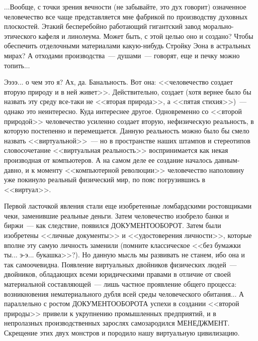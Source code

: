 \documentclass{scrbook}
\newcommand{\flqq}{<<}
\newcommand{\frqq}{>>}
\newcommand{\mdash}{~--- }
\begin{document}
...Вообще, с точки зрения вечности (не забывайте, это дух говорит) означенное человечество все чаще представляется мне фабрикой по производству духовных плоскостей. Этакий бесперебойно работающий гигантский завод морально-этического кафеля и линолеума. Может быть, с этой целью оно и создано? Чтобы обеспечить отделочными материалами какую-нибудь Стройку Эона в астральных мирах? А отходами производства{\mdash}душами{\mdash}говорят, еще и печку можно топить...

Ээээ... о чем это я? Ах, да. Банальность. Вот она: {\flqq}человечество создает вторую природу и в ней живет{\frqq}. Действительно, создает (хотя вернее было бы назвать эту среду все-таки не {\flqq}вторая природа{\frqq}, а {\flqq}пятая стихия{\frqq}){\mdash}однако это неинтересно. Куда интереснее другое. Одновременно со {\flqq}второй природой{\frqq} человечество усиленно создает вторую, нефизическую реальность, в которую постепенно и перемещается. Данную реальность можно было бы смело назвать {\flqq}виртуальной{\frqq}{\mdash}но в пространстве наших штампов и стереотипов словосочетание {\flqq}виртуальная реальность{\frqq} воспринимается как некая производная от компьютеров. А на самом деле ее создание началось давным-давно, и к моменту {\flqq}компьютерной революции{\frqq} человечество наполовину уже покинуло реальный физический мир, по пояс погрузившись в {\flqq}виртуал{\frqq}.

Первой ласточкой явления стали еще изобретенные ломбардскими ростовщиками чеки, заменившие реальные деньги. Затем человечество изобрело банки и биржи{\mdash}как следствие, появился ДОКУМЕНТООБОРОТ. Затем были изобретены {\flqq}личные документы{\frqq} и {\flqq}удостоверения личности{\frqq}, которые вполне эту самую личность заменили (помните классическое {\flqq}без бумажки ты... э-э... букашка{\frqq}?). Но данную мысль мы развивать не станем, ибо она и так самоочевидна. Появление виртуальных двойников физических людей{\mdash}двойников, обладающих всеми юридическими правами в отличие от своей материальной составляющей{\mdash}лишь частное проявление общего процесса: возникновения нематериального дубля всей среды человеческого обитания... А параллельно с ростом ДОКУМЕНТООБОРОТА успехи в создании {\flqq}второй природы{\frqq} привели к укрупнению промышленных предприятий, и в непролазных производственных зарослях самозародился МЕНЕДЖМЕНТ. Скрещение этих двух монстров и породило нашу виртуальную цивилизацию.
\end{document}
